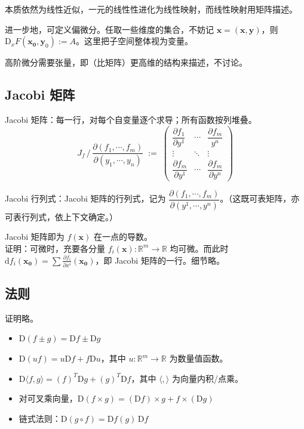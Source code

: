 \documentclass[12pt, a4paper, UTF8, openany]{ctexbook}
\newcommand{\dif}{\mathrm{d}}
\newcommand{\Dif}{\mathrm{D}}
\newcommand{\field}[1]{\mathbb{#1}}%
\newcommand{\mat}[1]{\mathbf{#1}}
\newcommand{\inner}[2]{\langle #1, #2 \rangle}
\begin{document}
        本质依然为线性近似，一元的线性性进化为线性映射，而线性映射用矩阵描述。

        进一步地，可定义偏微分。任取一些维度的集合，不妨记 $\mat{x} = (\mat{x}, \mat{y})$，则 $\Dif_x F(\mat{x_0}, \mat{y}_0) := A$。这里把子空间整体视为变量。

        高阶微分需要张量，即（比矩阵）更高维的结构来描述，不讨论。

        \subsection{Jacobi 矩阵}
        Jacobi 矩阵：每一行，对每个自变量逐个求导；所有函数按列堆叠。
        $$J_f \, / \, \frac{\partial (f_1, \cdots, f_m)}{\partial (y_1, \cdots, y_n)} \; := \; \begin{pmatrix}
            \dfrac{\partial f_1}{\partial y^1} & \cdots & \dfrac{\partial f_m}{y^n} \\
            \vdots & \ddots & \vdots \\
            \dfrac{\partial f_m}{\partial y^1} & \cdots & \dfrac{\partial f_m}{\partial y^n}
        \end{pmatrix}$$

        Jacobi 行列式：Jacobi 矩阵的行列式，记为 $\dfrac{\partial (f_1, \cdots, f_m)}{\partial (y^1, \cdots, y^n)}$。（这既可表矩阵，亦可表行列式，依上下文确定。）

        Jacobi 矩阵即为 $f(\mat{x})$ 在一点的导数。\\
        证明：可微时，充要各分量 $f_i(\mat{x}): \field{R}^m \to \field{R}$ 均可微。而此时 $\dif f_i(\mat{x_0}) = \sum \frac{\partial f_i}{\partial x^i}(\mat{x_0})$，即 Jacobi 矩阵的一行。细节略。

        \subsection{法则}
        证明略。
        \begin{itemize}
            \item $\Dif (f \pm g) = \Dif f \pm \Dif g$
            \item $\Dif (u f) = u \Dif f + f\Dif u$，其中 $u: \field{R}^m \to \field{R}$ 为数量值函数。
            \item $\Dif \inner{f}{g} = (f)^T\Dif g + (g)^T\Dif f$，其中 $\inner{}{}$ 为向量内积/点乘。
            \item 对可叉乘向量，$\Dif (f \times g) = (\Dif f) \times g + f \times (\Dif g)$
            \item 链式法则：$\Dif (g \circ f) = \Dif f(g) \,\Dif f$
        \end{itemize}
\end{document}
